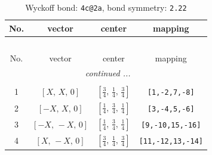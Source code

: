 \documentclass[fleqn,8pt]{jsarticle}
\begin{document}
\renewcommand{\arraystretch}{1.2}
\begin{longtable}{cccc}
\caption{Wyckoff bond: {\tt 4c@2a}, bond symmetry: {\tt 2.22}}
 \\
 \hline \hline
No. & vector & center & mapping \\ \hline \endfirsthead

\multicolumn{3}{l}{\tablename\ \thetable{}} \\
 \hline \hline
No. & vector & center & mapping \\ \hline \endhead

 \hline \hline
\multicolumn{3}{r}{\footnotesize\it continued ...} \\ \endfoot

 \hline \hline
\multicolumn{3}{r}{} \\ \endlastfoot

1 & $\left[ X,\, X,\, 0 \right]$ & $\left[ \frac{3}{4},\, \frac{1}{4},\, \frac{3}{4} \right]$ & {\tt [1,-2,7,-8]} \\ \hline
2 & $\left[ - X,\, X,\, 0 \right]$ & $\left[ \frac{1}{4},\, \frac{3}{4},\, \frac{1}{4} \right]$ & {\tt [3,-4,5,-6]} \\ \hline
3 & $\left[ - X,\, - X,\, 0 \right]$ & $\left[ \frac{1}{4},\, \frac{3}{4},\, \frac{1}{4} \right]$ & {\tt [9,-10,15,-16]} \\ \hline
4 & $\left[ X,\, - X,\, 0 \right]$ & $\left[ \frac{3}{4},\, \frac{1}{4},\, \frac{3}{4} \right]$ & {\tt [11,-12,13,-14]} \\
\end{longtable}
\renewcommand{\arraystretch}{1.2}
\end{document}
